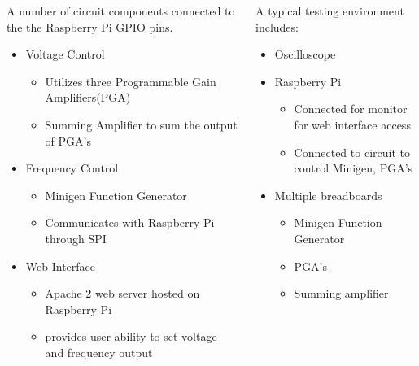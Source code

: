 \documentclass[25pt, a0paper, portrait, margin=0mm, innermargin=15mm, blockverticalspace=15mm, colspace=15mm, subcolspace=8mm]{tikzposter}
\begin{document}
\begin{columns}
{\begin{multicols}{2}
A number of circuit components connected 
to the the Raspberry Pi GPIO pins.
\begin{itemize}
\item Voltage Control
  \begin{itemize}
  \item Utilizes three Programmable Gain Amplifiers(PGA)
  \item Summing Amplifier to sum the output of PGA's
  \end{itemize}
\item Frequency Control
  \begin{itemize}
  \item Minigen Function Generator
  \item Communicates with Raspberry Pi through SPI
  \end{itemize}
\item Web Interface
  \begin{itemize}
  \item Apache 2 web server hosted on Raspberry Pi
  \item provides user ability to set voltage and frequency output
  \end{itemize}
\end{itemize}

\end{multicols}
}

%
%
{
%
%
\begin{multicols}{2}



A typical testing environment includes:
\begin{itemize}
\item Oscilloscope
\item Raspberry Pi
  \begin{itemize}
  \item Connected for monitor for web interface access
  \item Connected to circuit to control Minigen, PGA's
  \end{itemize}
\item Multiple breadboards
  \begin{itemize}
  \item Minigen Function Generator
  \item PGA's
  \item Summing amplifier
  \end{itemize}
\end{itemize}


\end{multicols}}
\end{columns}
\end{document}
